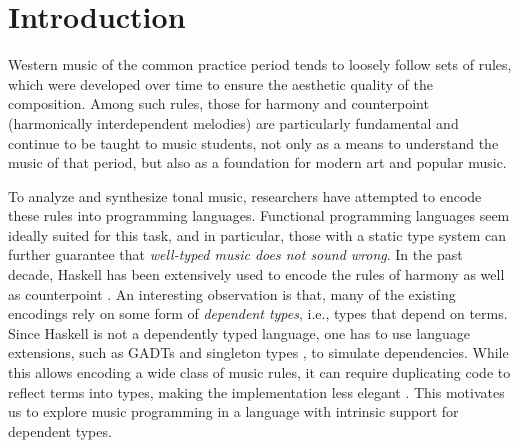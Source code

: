 \documentclass[sigplan,10pt,screen]{acmart}
\begin{document}


\maketitle

\section{Introduction}

Western music of the common practice period tends to loosely
follow sets of rules, which were developed over time to ensure
the aesthetic quality of the composition. 
Among such rules, those for harmony \citep{piston1987harmony}
and counterpoint (harmonically interdependent melodies) 
\citep{fux1965study} are particularly fundamental and continue 
to be taught to music students, not only as a means to understand 
the music of that period, but also as a foundation for modern art 
and popular music.

To analyze and synthesize tonal music, researchers have
attempted to encode these rules into programming languages.
Functional programming languages seem
ideally suited for this task, and in particular, those with a static
type system can further guarantee that \emph{well-typed music 
does not sound wrong}.
In the past decade, Haskell has been extensively used to encode
the rules of harmony \citep{fmmh, hihseufha, faamh, hafha, fghm}
as well as counterpoint \citep{szamozvancev2017well}.
An interesting observation is that, many of the existing encodings
rely on some form of \emph{dependent types}, i.e.,  
types that depend on terms. 
Since Haskell is not a dependently typed language, one has to
use language extensions, such as GADTs \citep{cheney2002lightweight} 
and singleton types \citep{eisenberg2013dependently},
to simulate dependencies.
While this allows encoding a wide class of music rules, it can
require duplicating code to reflect terms into 
types, making the implementation less elegant 
\citep{monnier2010singleton}.
This motivates us to explore music programming in a language
with intrinsic support for dependent types.
\end{document}
